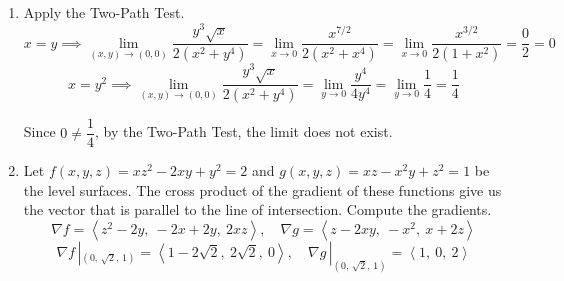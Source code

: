 \documentclass[a4paper, 12pt]{article}
\begin{document}
\begin{enumerate}[leftmargin=*,label=\textbf{\arabic*.}]
\begin{enumerate}[leftmargin=*,label=\textbf{\alph*.}]
\begin{center}
\hspace{1em}
\end{center}
\end{enumerate}

\item Apply the Two-Path Test.
\[x=y\implies\lim_{(x,y)\to(0,0)}\frac{y^3\sqrt x}{2\left(x^2+y^4\right)}=\lim_{x\to0}\frac{x^{7/2}}{2\left(x^2+x^4\right)}=\lim_{x\to0}\frac{x^{3/2}}{2\left(1+x^2\right)}=\frac02=0\]
\[x=y^2\implies\lim_{(x,y)\to(0,0)}\frac{y^3\sqrt x}{2\left(x^2+y^4\right)}=\lim_{y\to0}\frac{y^4}{4y^4}=\lim_{y\to0}\frac14=\frac14\]

Since $0\neq\dfrac14$, by the Two-Path Test, the limit does not exist.

\item Let $f(x,y,z)=xz^2-2xy+y^2=2$ and $g(x,y,z)=xz-x^2y+z^2=1$ be the level surfaces. The cross product of the gradient of these functions give us the vector that is parallel to the line of intersection. Compute the gradients.
\[\nabla f=\left\langle z^2-2y,\:-2x+2y,\:2xz\right\rangle,\quad \nabla g=\left\langle z-2xy,\:-x^2,\: x+2z\right\rangle\]
\[\nabla f\,|_{\left(0,\,\sqrt2,\,1\right)}=\left\langle1-2\sqrt2,\:2\sqrt2,\:0\right\rangle,\quad \nabla g\,|_{\left(0,\,\sqrt2,\,1\right)}=\left\langle1,\:0,\:2\right\rangle\]


\end{enumerate}
\end{document}
